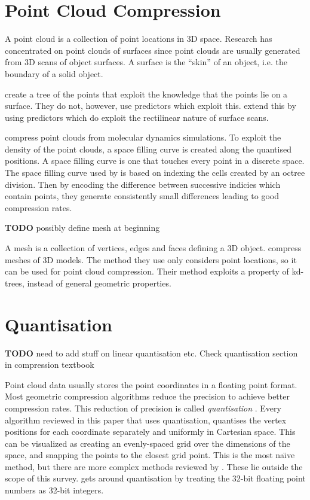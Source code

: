 \documentclass{report}
\newcommand{\todo}{\textbf{TODO} }
\begin{document}
\section{Point Cloud Compression}

A point cloud is a collection of point locations in 3D space. Research has
concentrated on point clouds of surfaces since point clouds are usually
generated from 3D scans of object surfaces. A surface is the ``skin'' of an
object, i.e. the boundary of a solid object.

\cite{gumholdcomp} create a tree of the points that exploit the knowledge that
the points lie on a surface. They do not, however, use predictors which
exploit this. \citet{merrycomp} extend this by using predictors which do
exploit the rectilinear nature of surface scans.

\citet{omeltchenko2000sls} compress point clouds from molecular dynamics
simulations. To exploit the density of the point clouds, a space filling curve
is created along the quantised positions. A space filling curve is one that
touches every point in a discrete space. The space filling curve used by
\citep{omeltchenko2000sls} is based on indexing the cells created by an octree
division. Then by encoding the difference between successive indicies which
contain points, they generate consistently small differences leading to good
compression rates.

\todo possibly define mesh at beginning

A mesh is a collection of vertices, edges and faces defining a 3D
object. \citet{devillers2000gci} compress meshes of 3D models. The method they
use only considers point locations, so it can be used for point cloud
compression. Their method exploits a property of kd-trees, instead of general
geometric properties.


\section{Quantisation}

\todo need to add stuff on linear quantisation etc. Check quantisation section
in compression textbook

Point cloud data usually stores the point coordinates in a floating point
format. Most geometric compression algorithms reduce the precision to achieve
better compression rates. This reduction of precision is called
\emph{quantisation} \citep{ag-racm-03}. Every algorithm reviewed in this paper
that uses quantisation, quantises the vertex positions for each coordinate
separately and uniformly in Cartesian space. This can be visualized as
creating an evenly-spaced grid over the dimensions of the space, and snapping
the points to the closest grid point. This is the most na\"{\i}ve method, but
there are more complex methods reviewed by \citep{ag-racm-03}. These lie
outside the scope of this survey. \citet{chen2005lcp} gets around quantisation
by treating the 32-bit floating point numbers as 32-bit integers.
\end{document}
